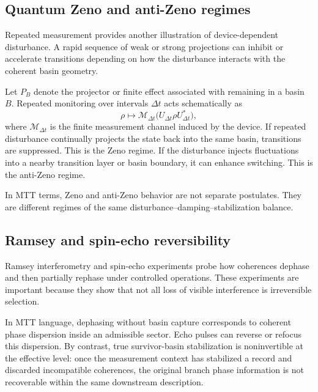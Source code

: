 \documentclass[11pt]{article}
\begin{document}
\subsection{Quantum Zeno and anti-Zeno regimes}
\label{subsec:zeno-module}

Repeated measurement provides another illustration of device-dependent disturbance. A
rapid sequence of weak or strong projections can inhibit or accelerate transitions depending
on how the disturbance interacts with the coherent basin geometry.

Let \(P_B\) denote the projector or finite effect associated with remaining in a basin \(B\).
Repeated monitoring over intervals \(\Delta t\) acts schematically as
\begin{equation}
  \rho
  \longmapsto
  \mathcal M_{\Delta t}
  \bigl(
  U_{\Delta t}\rho U_{\Delta t}^\ast
  \bigr),
\end{equation}
where \(\mathcal M_{\Delta t}\) is the finite measurement channel induced by the device.
If repeated disturbance continually projects the state back into the same basin, transitions
are suppressed. This is the Zeno regime. If the disturbance injects fluctuations into a
nearby transition layer or basin boundary, it can enhance switching. This is the anti-Zeno
regime.

In MTT terms, Zeno and anti-Zeno behavior are not separate postulates. They are different
regimes of the same disturbance--damping--stabilization balance.

\subsection{Ramsey and spin-echo reversibility}
\label{subsec:ramsey-echo}

Ramsey interferometry and spin-echo experiments probe how coherences dephase and then
partially rephase under controlled operations. These experiments are important because they
show that not all loss of visible interference is irreversible selection.

In MTT language, dephasing without basin capture corresponds to coherent phase dispersion
inside an admissible sector. Echo pulses can reverse or refocus this dispersion. By contrast,
true survivor-basin stabilization is noninvertible at the effective level: once the measurement
context has stabilized a record and discarded incompatible coherences, the original branch
phase information is not recoverable within the same downstream description.
\end{document}
